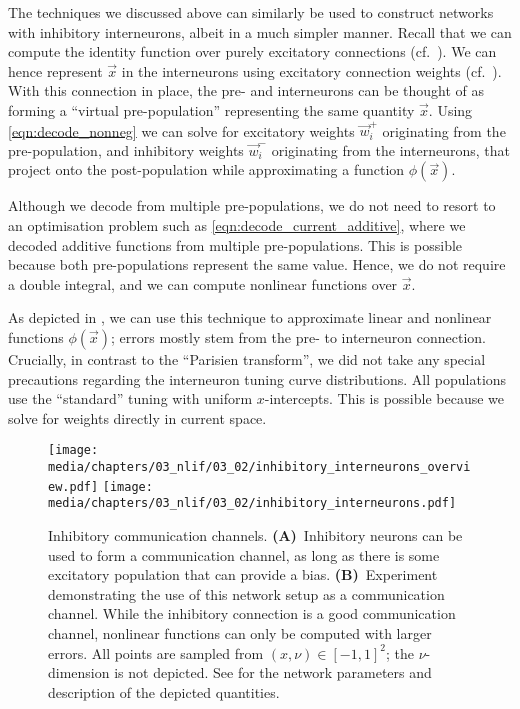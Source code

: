 The techniques we discussed above can similarly be used to construct networks with inhibitory interneurons, albeit in a much simpler manner.
Recall that we can compute the identity function over purely excitatory connections (cf.~).
We can hence represent $\vec x$ in the interneurons using excitatory connection weights (cf.~).
With this connection in place, the pre- and interneurons can be thought of as forming a \enquote{virtual pre-population} representing the same quantity $\vec x$.
Using \cref{eqn:decode_nonneg} we can solve for excitatory weights $\vec w_i^+$ originating from the pre-population, and inhibitory weights $\vec w_i^-$ originating from the interneurons, that project onto the post-population while approximating a function $\phi(\vec x)$.

Although we decode from multiple pre-populations, we do not need to resort to an optimisation problem such as \cref{eqn:decode_current_additive}, where we decoded additive functions from multiple pre-populations.
This is possible because both pre-populations represent the same value.
Hence, we do not require a double integral, and we can compute nonlinear functions over $\vec x$.

As depicted in , we can use this technique to approximate linear and nonlinear functions $\phi(\vec x)$; errors mostly stem from the pre- to interneuron connection.
Crucially, in contrast to the \enquote{Parisien transform}, we did not take any special precautions regarding the interneuron tuning curve distributions.
All populations use the \enquote{standard} tuning with uniform $x$-intercepts.
This is possible because we solve for weights directly in current space.

\begin{figure}
	\texttt{[image: media/chapters/03\_nlif/03\_02/inhibitory\_interneurons\_overview.pdf]}%
	\texttt{[image: media/chapters/03\_nlif/03\_02/inhibitory\_interneurons.pdf]}%
	{\label{fig:inhibitory_comm_a}}%
	{\label{fig:inhibitory_comm_b}}%
	\caption[Inhibitory communication channels]{Inhibitory communication channels.
	\textbf{(A)}~Inhibitory neurons can be used to form a communication channel, as long as there is some excitatory population that can provide a bias.
	\textbf{(B)}~Experiment demonstrating the use of this network setup as a communication channel.
	While the inhibitory connection is a good communication channel, nonlinear functions can only be computed with larger errors.
	All points are sampled from $(x, \nu) \in [-1, 1]^2$; the $\nu$-dimension is not depicted.
	See  for the network parameters and description of the depicted quantities.
	}
	\label{fig:inhibitory_comm}
\end{figure}

